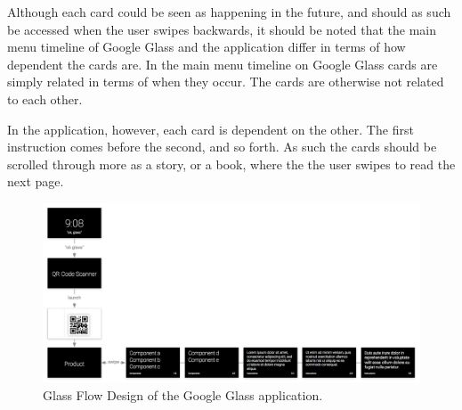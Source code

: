 Although each card could be seen as happening in the future, and should as such be accessed when the user swipes backwards, it should be noted that the main menu timeline of Google Glass and the application differ in terms of how dependent the cards are. In the main menu timeline on Google Glass cards are simply related in terms of when they occur. The cards are otherwise not related to each other.

In the application, however, each card is dependent on the other. The first instruction comes before the second, and so forth. As such the cards should be scrolled through more as a story, or a book, where the the user swipes to read the next page.

	\begin{figure}[ht!]
		\centering
		\includegraphics[width=150mm]{images/glaswareFlowDesignerScreenshot}
		\caption{Glass Flow Design of the Google Glass application.}
		\label{glassFlowDesign}
	\end{figure}